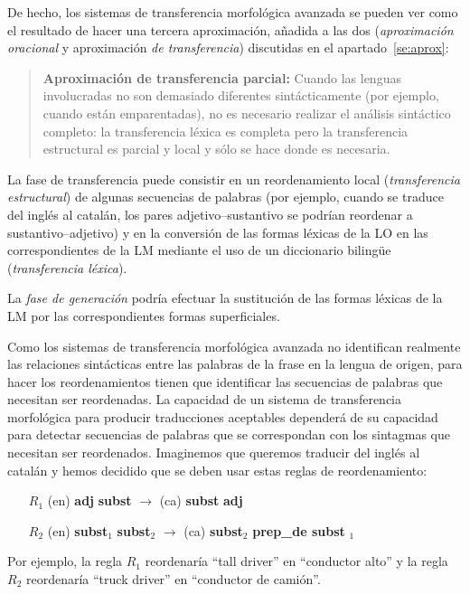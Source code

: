 De hecho, los sistemas de transferencia morfológica avanzada se pueden ver como el resultado de hacer una tercera aproximación, añadida a las dos (\emph{aproximación oracional} y aproximación \emph{de transferencia}) discutidas en el apartado~\ref{se:aprox}: \begin{quote} \textbf{Aproximación de transferencia parcial:} Cuando las lenguas involucradas no son demasiado diferentes sintácticamente (por ejemplo, cuando están emparentadas), no es necesario realizar el análisis sintáctico completo: la transferencia léxica es completa pero la transferencia estructural es parcial y local y sólo se hace donde es necesaria. \end{quote} 

La fase de transferencia \emph{} puede consistir en un reordenamiento local (\emph{transferencia estructural}) de algunas secuencias de palabras (por ejemplo, cuando se traduce del inglés al catalán, los pares adjetivo--sustantivo se podrían reordenar a sustantivo--adjetivo) y en la conversión de las formas léxicas de la LO en las correspondientes de la LM mediante el uso de un diccionario bilingüe (\emph{transferencia léxica}). 

La \emph{fase de generación} podría efectuar la sustitución de las formas léxicas de la LM por las correspondientes formas superficiales. 

Como los sistemas de transferencia morfológica avanzada no identifican realmente las relaciones sintácticas entre las palabras de la frase en la lengua de origen, para hacer los reordenamientos tienen que identificar las secuencias de palabras que necesitan ser reordenadas. La capacidad de un sistema de transferencia morfológica para producir traducciones aceptables dependerá de su capacidad para detectar secuencias de palabras que se correspondan con los sintagmas que necesitan ser reordenados. Imaginemos que queremos traducir del inglés al catalán y hemos decidido que se deben usar estas reglas de reordenamiento: \begin{itemize} \item [$R_1$] (en) \textbf{adj} \textbf{subst} $\rightarrow$ (ca) \textbf{subst} \textbf{adj} \item [$R_2$] (en) \textbf{subst}$_1$ \textbf{subst}$_2$ $\rightarrow$ (ca) \textbf{subst}$_2$ \textbf{prep\_de subst} \textbf{}$_1$ \end{itemize} Por ejemplo, la regla $R_1$ reordenaría ``tall driver'' en ``conductor alto'' y la regla $R_2$ reordenaría ``truck driver'' en ``conductor de camión''. 

